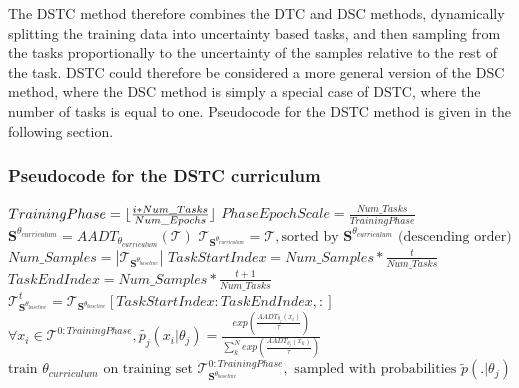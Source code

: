 The DSTC method therefore combines the DTC and DSC methods, dynamically splitting the training data into uncertainty based tasks, and then sampling from the tasks proportionally to the uncertainty of the samples relative to the rest of the task. DSTC could therefore be considered a more general version of the DSC method, where the DSC method is simply a special case of DSTC, where the number of tasks is equal to one. Pseudocode for the DSTC method is given in the following section.

\subsubsection{Pseudocode for the DSTC curriculum}\label{sec:DSTCPseudocode}
\begin{algorithmic}
\STATE $TrainingPhase = \lfloor\frac{i*Num\_Tasks}{Num\_Epochs}\rfloor$
\STATE $PhaseEpochScale = \frac{Num\_Tasks}{TrainingPhase}$
\STATE $\mathbf{S}^{\theta_{curriculum}} = AADT_{\theta_{curriculum}}(\mathcal{T})$
\STATE $\mathcal{T}_{\mathbf{S}^{\theta_{curriculum}}} = \mathcal{T}, \text{sorted by } \mathbf{S}^{\theta_{curriculum}} \text{ (descending order)}$ 
\STATE $Num\_Samples = |\mathcal{T}_{\mathbf{S}^{\theta_{baseline}}}|$
\STATE $TaskStartIndex = Num\_Samples*\frac{t}{Num\_Tasks} $
\STATE $TaskEndIndex = Num\_Samples*\frac{t+1}{Num\_Tasks} $
\STATE $\mathcal{T}^{t}_{\mathbf{S}^{\theta_{baseline}}} = \mathcal{T}_{\mathbf{S}^{\theta_{baseline}}}[TaskStartIndex:TaskEndIndex,:] $
\ENDFOR
\STATE $\forall x_i \in \mathcal{T}^{0:TrainingPhase}, \tilde{p_j}(x_i | \theta_j) = \frac{exp(\frac{AADT_{\theta_j}(x_i)}{\tau})}{\sum_{k}^{N} exp(\frac{AADT_{\theta_j}(x_k)}{\tau})}$
\STATE $\text{train }  \theta_{curriculum} \text{ on training set } \mathcal{T}^{0:TrainingPhase}_{\mathbf{S}^{\theta_{baseline}}}, \text{ sampled with probabilities }  \tilde{p}(. | \theta_j)   $
\ENDFOR
\ENDFOR
\end{algorithmic}


